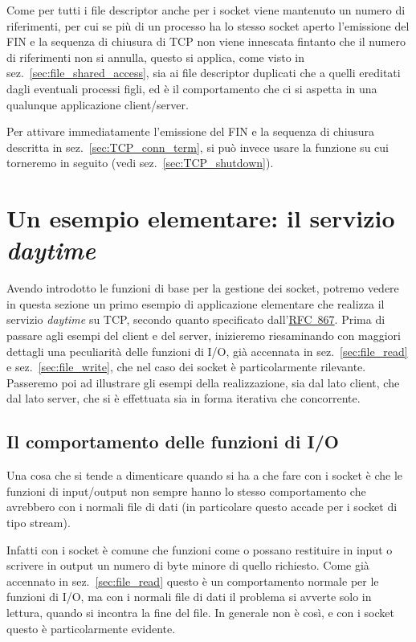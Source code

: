 Come per tutti i file descriptor anche per i socket viene mantenuto un numero
di riferimenti, per cui se più di un processo ha lo stesso socket aperto
l'emissione del FIN e la sequenza di chiusura di TCP non viene innescata
fintanto che il numero di riferimenti non si annulla, questo si applica, come
visto in sez.~\ref{sec:file_shared_access}, sia ai file descriptor duplicati
che a quelli ereditati dagli eventuali processi figli, ed è il comportamento
che ci si aspetta in una qualunque applicazione client/server.

Per attivare immediatamente l'emissione del FIN e la sequenza di chiusura
descritta in sez.~\ref{sec:TCP_conn_term}, si può invece usare la funzione
 su cui torneremo in seguito (vedi
sez.~\ref{sec:TCP_shutdown}).


\section{Un esempio elementare: il servizio \textit{daytime}}
\label{sec:TCP_daytime_application}

Avendo introdotto le funzioni di base per la gestione dei socket, potremo
vedere in questa sezione un primo esempio di applicazione elementare che
realizza il servizio \textit{daytime} su TCP, secondo quanto specificato
dall'\href{http://www.ietf.org/rfc/rfc867.txt}{RFC~867}.  Prima di passare
agli esempi del client e del server, inizieremo riesaminando con maggiori
dettagli una peculiarità delle funzioni di I/O, già accennata in
sez.~\ref{sec:file_read} e sez.~\ref{sec:file_write}, che nel caso dei socket
è particolarmente rilevante.  Passeremo poi ad illustrare gli esempi della
realizzazione, sia dal lato client, che dal lato server, che si è effettuata
sia in forma iterativa che concorrente.


\subsection{Il comportamento delle funzioni di I/O}
\label{sec:sock_io_behav}

Una cosa che si tende a dimenticare quando si ha a che fare con i socket è che
le funzioni di input/output non sempre hanno lo stesso comportamento che
avrebbero con i normali file di dati (in particolare questo accade per i
socket di tipo stream).

Infatti con i socket è comune che funzioni come  o 
possano restituire in input o scrivere in output un numero di byte minore di
quello richiesto. Come già accennato in sez.~\ref{sec:file_read} questo è un
comportamento normale per le funzioni di I/O, ma con i normali file di dati il
problema si avverte solo in lettura, quando si incontra la fine del file. In
generale non è così, e con i socket questo è particolarmente evidente.


